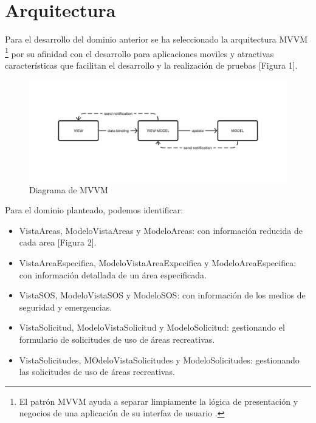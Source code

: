\documentclass{scrartcl}
\begin{document}
    \section{Arquitectura}
        Para el desarrollo del dominio anterior se ha seleccionado la arquitectura MVVM
         \footnote[1]{El patrón MVVM ayuda a separar limpiamente la lógica de presentación y negocios de
         una aplicación de su interfaz de usuario \cite[MVVM]{msmvvm}.} por su afinidad con el desarrollo
         para aplicaciones moviles y atractivas características que facilitan el desarrollo y la realización
         de pruebas [Figura 1].

         \begin{figure}
            \centerline{\includegraphics[scale=0.4]{mvvmdiagram}}
            \caption{Diagrama de MVVM}
            \label{fig:mvvmdiagram}
         \end{figure}

        Para el dominio planteado, podemos identificar:

        \begin{itemize}
            \item VistaAreas, ModeloVistaAreas y ModeloAreas: con información reducida
                   de cada area [Figura 2].
            \item VistaAreaEspecifica, ModeloVistaAreaExpecifica y ModeloAreaEspecifica:
                   con información detallada de un área especificada.
            \item VistaSOS, ModeloVistaSOS y ModeloSOS: con información de los medios de
                   seguridad y emergencias.
            \item VistaSolicitud, ModeloVistaSolicitud y ModeloSolicitud: gestionando el
                   formulario de solicitudes de uso de áreas recreativas.
            \item VistaSolicitudes, MOdeloVistaSolicitudes y ModeloSolicitudes: gestionando
                   las solicitudes de uso de áreas recreativas.
        \end{itemize}
\end{document}
